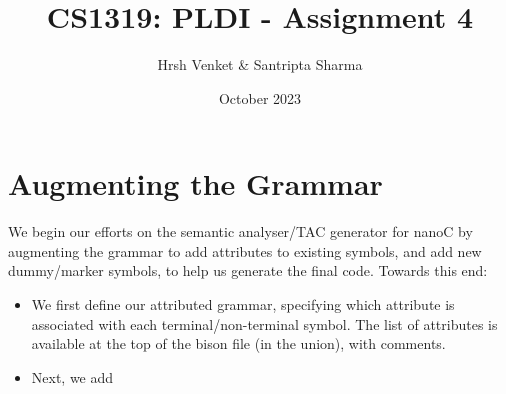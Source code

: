 \documentclass{article}
\title{CS1319: PLDI - Assignment 4}
\author{Hrsh Venket \& Santripta Sharma}
\date{October 2023}
\begin{document}
\maketitle 

\section{Augmenting the Grammar}
We begin our efforts on the semantic analyser/TAC generator for nanoC by augmenting the grammar to add attributes to existing symbols, and add new dummy/marker symbols, to help us generate the final code. Towards this end:

\begin{itemize}
	\item We first define our attributed grammar, specifying which attribute is associated with each terminal/non-terminal symbol. The list of attributes is available at the top of the bison file (in the union), with comments.
	\item Next, we add 
\end{itemize}
\end{document}
